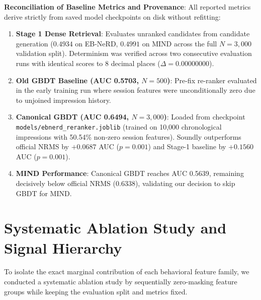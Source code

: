 \documentclass[11pt,a4paper]{article}
\begin{document}
\noindent\textbf{Reconciliation of Baseline Metrics and Provenance}:
All reported metrics derive strictly from saved model checkpoints on disk without refitting:
\begin{enumerate}[leftmargin=1.8em, itemsep=2pt]
    \item \textbf{Stage 1 Dense Retrieval}: Evaluates unranked candidates from candidate generation ($0.4934$ on EB-NeRD, $0.4991$ on MIND across the full $N=3,000$ validation split). Determinism was verified across two consecutive evaluation runs with identical scores to 8 decimal places ($\Delta = 0.00000000$).
    \item \textbf{Old GBDT Baseline (AUC 0.5703, $N=500$)}: Pre-fix re-ranker evaluated in the early training run where session features were unconditionally zero due to unjoined impression history.
    \item \textbf{Canonical GBDT (AUC 0.6494, $N=3,000$)}: Loaded from checkpoint \nolinkurl{models/ebnerd_reranker.joblib} (trained on 10,000 chronological impressions with 50.54\% non-zero session features). Soundly outperforms official NRMS by $+0.0687$ AUC ($p=0.001$) and Stage-1 baseline by $+0.1560$ AUC ($p=0.001$).
    \item \textbf{MIND Performance}: Canonical GBDT reaches AUC 0.5639, remaining decisively below official NRMS ($0.6338$), validating our decision to skip GBDT for MIND.
\end{enumerate}

\section{Systematic Ablation Study and Signal Hierarchy}

To isolate the exact marginal contribution of each behavioral feature family, we conducted a systematic ablation study by sequentially zero-masking feature groups while keeping the evaluation split and metrics fixed.
\end{document}
